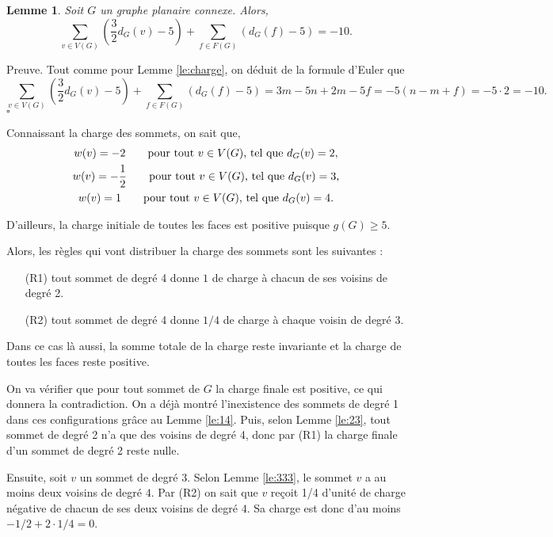 \documentclass[10pt,a4paper]{article}
\newtheorem{lemme}{Lemme}
\newcommand{\ep}{{\hfill $\square$}}
\begin{document}
\begin{lemme}
Soit $G$ un graphe planaire connexe. Alors,
$$
\sum_{v \in V(G)} \left(\frac{3}{2} d_G(v) - 5\right) + \sum_{f\in F(G)} \left(d_G(f) -5\right) = -10.
$$
\label{le:cha2}
\end{lemme}

Preuve.
Tout comme pour Lemme \ref{le:charge}, on déduit de la formule d'Euler que
$$ 
\sum_{v \in V(G)} \left(\frac{3}{2}d_G(v) - 5\right) + \sum_{f\in F(G)} \left(d_G(f) -5\right) = 3m -5n + 2m - 5f = -5(n - m + f) = -5 \cdot 2 = -10.
$$
\ep 

Connaissant la charge des sommets, on sait que,
$$
\gathered
w(v) = -2 \qquad \textrm{pour tout $v \in V(G)$, tel que } d_G(v) = 2,\\
w(v) = -\frac{1}{2} \qquad \textrm{pour tout $v \in V(G)$, tel que } d_G(v) = 3,\\
w(v) =  1 \qquad \textrm{pour tout $v \in V(G)$, tel que } d_G(v) = 4.
\endgathered
$$

D'ailleurs, la charge initiale de toutes les faces est positive puisque $g(G) \geq 5$.

Alors, les règles qui vont distribuer la charge des sommets sont les suivantes :

\begin{enumerate}
\item[(R1)] tout sommet de degré 4 donne $1$ de charge à chacun de ses voisins de degré 2.
\item[(R2)] tout sommet de degré 4 donne $1/4$ de charge à chaque voisin de degré 3.
\end{enumerate}
Dans ce cas là aussi, la somme totale de la charge reste invariante et la charge de toutes les faces reste positive.

On va vérifier que pour tout sommet de $G$ la charge finale est positive, ce qui donnera la contradiction. On a déjà montré l'inexistence des sommets de degré 1 dans ces configurations grâce au Lemme \ref{le:14}. Puis, selon Lemme \ref{le:23}, tout sommet de degré 2 n'a que des voisins de degré 4, donc par (R1) la charge finale d'un sommet de degré 2 reste nulle.

Ensuite, soit $v$ un sommet de degré $3$. Selon Lemme \ref{le:333}, le sommet $v$ a au moins deux voisins de degré $4$. Par (R2) on sait que $v$ reçoit 1/4 d'unité de charge négative de chacun de ses deux voisins de degré $4$. Sa charge est donc d'au moins $-1/2+2\cdot 1/4 = 0$.

\end{document}
